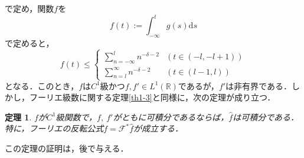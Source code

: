 \documentclass[a4j]{jsbook}
\newtheorem{theorem}{定理}
\numberwithin{theorem}{chapter}  %
\begin{document}
で定め，関数\(f\)を
\begin{equation*}
    f(t):=\int_{-\infty}^t g(s)\mathrm{d}s
\end{equation*}
で定めると，
\begin{equation*}
    f(t)\leq
    \begin{cases}
    \sum_{n=-\infty}^l n^{-\delta-2} & (t\in(-l, -l+1)) \\
    \sum_{n=l}^\infty n^{-\delta-2} & (t\in(l-1, l))
    \end{cases}
\end{equation*}
となる．このとき，\(f\)は\(C^1\)級かつ\(f, f'\in L^1(\mathbb{R})\)であるが，\(f'\)は非有界である．しかし，フーリエ級数に関する定理\ref{th1-3}と同様に，次の定理が成り立つ．
\begin{theorem}
\label{th3-6}
\(f\)が\(C^1\)級関数で，\(f,\ f'\)がともに可積分であるならば，\(\hat{f}\)は可積分である．特に，フーリエの反転公式\(f=\mathcal{F}^*\hat{f}\)が成立する．
\end{theorem}
この定理の証明は，後で与える．
\end{document}
